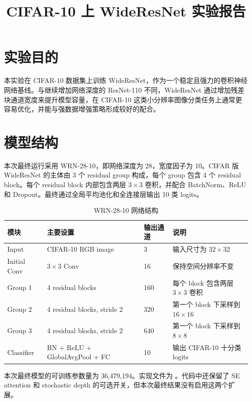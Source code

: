 \documentclass[UTF8]{ctexart}
\title{CIFAR-10 上 WideResNet 实验报告}
\author{}
\date{}
\begin{document}
\maketitle

\section{实验目的}

本实验在 CIFAR-10 数据集上训练 WideResNet，作为一个稳定且强力的卷积神经网络基线。与继续增加网络深度的
ResNet-110 不同，WideResNet 通过增加残差块通道宽度来提升模型容量，在 CIFAR-10 这类小分辨率图像分类任务上通常更容易优化，并能与强数据增强策略形成较好的配合。

\section{模型结构}

本次最终运行采用 WRN-28-10，即网络深度为 28，宽度因子为 10。CIFAR 版 WideResNet 的主体由 3 个 residual group 构成，每个 group 包含 4 个 residual block。每个 residual block 内部包含两层 $3\times3$ 卷积，并配合 BatchNorm、ReLU 和 Dropout。最终通过全局平均池化和全连接层输出 10 类 logits。

\begin{table}[H]
    \centering
    \caption{WRN-28-10 网络结构}
    \begin{tabularx}{\textwidth}{lllY}
        \toprule
        模块 & 主要设置 & 输出通道 & 说明 \\
        \midrule
        Input & CIFAR-10 RGB image & 3 & 输入尺寸为 $32\times32$ \\
        Initial Conv & $3\times3$ Conv & 16 & 保持空间分辨率不变 \\
        Group 1 & 4 residual blocks & 160 & 每个 block 包含两层 $3\times3$ 卷积 \\
        Group 2 & 4 residual blocks, stride 2 & 320 & 第一个 block 下采样到 $16\times16$ \\
        Group 3 & 4 residual blocks, stride 2 & 640 & 第一个 block 下采样到 $8\times8$ \\
        Classifier & BN + ReLU + GlobalAvgPool + FC & 10 & 输出 CIFAR-10 十分类 logits \\
        \bottomrule
    \end{tabularx}
\end{table}

本次最终模型的可训练参数量为 36,479,194。实现文件为 。代码中还保留了 SE attention 和 stochastic depth 的可选开关，但本次最终结果没有启用这两个扩展。
\end{document}
